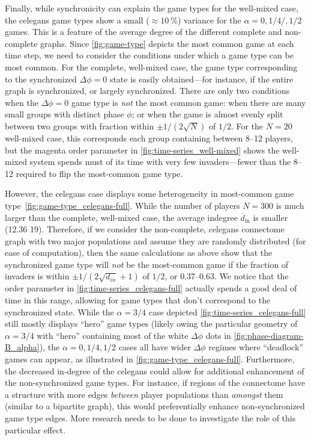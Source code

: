 \documentclass[pdflatex,lineno,referee,sn-mathphys-ay]{sn-jnl}
\begin{document}
Finally, while synchronicity can explain the game types
for the
 well-mixed case,
the
 \gls{celegans} game types
show a small ($\approx \SI{10}{\percent}$)
variance for the $\alpha = 0,1/4/,1/2$ games.
This is a feature of the average degree
of the different complete and non-complete graphs.
Since \cref{fig:game-type} depicts the most common game at each time step,
we need to consider the conditions under which a game type can be most common.
For the complete, well-mixed case, the game type corresponding
to the synchronized $\Delta \phi = 0$ state
is easily obtained---for instance, if the entire graph is synchronized,
or largely synchronized.
There are only two conditions when the $\Delta \phi = 0$ game type
is \emph{not} the most common game:
when there are many small groups with distinct phase $\phi$;
or when the game is almost evenly split between two groups
with fraction within $\pm 1/(2 \sqrt{N})$ of $1/2$.
For the $N = 20$ well-mixed case, this corresponds
each group containing between \numrange{8}{12} players,
but the magenta order parameter in \cref{fig:time-series_well-mixed}
shows the well-mixed system spends must of its time with very few invaders---fewer
than the \numrange{8}{12} required to flip the most-common game type.

However, the \gls{celegans} case displays some heterogeneity
in most-common game type~\cref{fig:game-type_celegans-full}.
While the number of players $N = 300$ is much larger
than the complete, well-mixed case,
the average indegree $\overline{d}_{\text{in}}$
is smaller (\num{12.36} \vs \num{19}).
Therefore, if we consider the non-complete, \gls{celegans} connectome graph
with two major populations
and assume they are randomly distributed (for ease of computation),
then the same calculations as above show that
the synchronized game type will \emph{not} be the most-common game
if the fraction of invaders is within $\pm 1/(2 \sqrt{d_{in}} + 1)$
of $1/2$, or \numrange{0.37}{0.63}.
We notice that the order parameter in \cref{fig:time-series_celegans-full}
actually spends a good deal of time in this range,
allowing for game types that don't correspond to the synchronized state.
While the $\alpha = 3/4$ case depicted \cref{fig:time-series_celegans-full}
still mostly displays ``hero'' game types
(likely owing the particular geometry of $\alpha = 3/4$
with ``hero'' containing most of the white $\Delta \phi$ dots
in \cref{fig:phase-diagram-B_alpha}),
the $\alpha = 0, 1/4, 1/2$ cases all have wider $\Delta \phi$ regimes where
``deadlock'' games can appear, as illustrated in \cref{fig:game-type_celegans-full}.
Furthermore, the decreased in-degree of the \gls{celegans} could allow
for additional enhancement of the non-synchronized game types.
For instance, if regions of the connectome have a structure with more edges
\emph{between} player populations than \emph{amongst} them
(similar to a bipartite graph),
this would preferentially enhance non-synchronized game type edges.
More research needs to be done to investigate the role of this particular effect.
\end{document}

